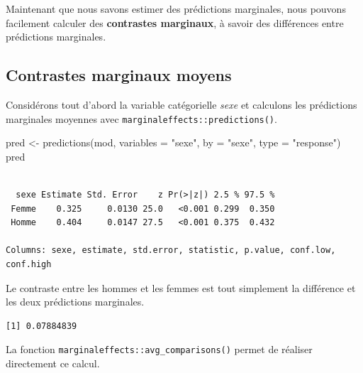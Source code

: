 \documentclass[
  letterpaper,
  DIV=11,
  numbers=noendperiod,
  oneside]{scrreprt}
\newenvironment{Shaded}{\begin{snugshade}}{\end{snugshade}}
\newcommand{\AttributeTok}[1]{\textcolor[rgb]{0.40,0.45,0.13}{#1}}
\newcommand{\DecValTok}[1]{\textcolor[rgb]{0.68,0.00,0.00}{#1}}
\newcommand{\FunctionTok}[1]{\textcolor[rgb]{0.28,0.35,0.67}{#1}}
\newcommand{\NormalTok}[1]{\textcolor[rgb]{0.00,0.23,0.31}{#1}}
\newcommand{\OtherTok}[1]{\textcolor[rgb]{0.00,0.23,0.31}{#1}}
\newcommand{\SpecialCharTok}[1]{\textcolor[rgb]{0.37,0.37,0.37}{#1}}
\newcommand{\StringTok}[1]{\textcolor[rgb]{0.13,0.47,0.30}{#1}}
\begin{document}
Maintenant que nous savons estimer des prédictions marginales, nous
pouvons facilement calculer des \textbf{contrastes marginaux}, à savoir
des différences entre prédictions marginales.

\hypertarget{contrastes-marginaux-moyens}{%
\subsection{Contrastes marginaux
moyens}\label{contrastes-marginaux-moyens}}

Considérons tout d'abord la variable catégorielle \emph{sexe} et
calculons les prédictions marginales moyennes avec
\texttt{marginaleffects::predictions()}.

\begin{Shaded}
\begin{Highlighting}[]
\NormalTok{pred }\OtherTok{\textless{}{-}} \FunctionTok{predictions}\NormalTok{(mod, }\AttributeTok{variables =} \StringTok{"sexe"}\NormalTok{, }\AttributeTok{by =} \StringTok{"sexe"}\NormalTok{, }\AttributeTok{type =} \StringTok{"response"}\NormalTok{)}
\NormalTok{pred}
\end{Highlighting}
\end{Shaded}

\begin{verbatim}

  sexe Estimate Std. Error    z Pr(>|z|) 2.5 % 97.5 %
 Femme    0.325     0.0130 25.0   <0.001 0.299  0.350
 Homme    0.404     0.0147 27.5   <0.001 0.375  0.432

Columns: sexe, estimate, std.error, statistic, p.value, conf.low, conf.high 
\end{verbatim}

Le contraste entre les hommes et les femmes est tout simplement la
différence et les deux prédictions marginales.

\begin{Shaded}
\end{Shaded}

\begin{verbatim}
[1] 0.07884839
\end{verbatim}

La fonction \texttt{marginaleffects::avg\_comparisons()} permet de
réaliser directement ce calcul.
\end{document}
